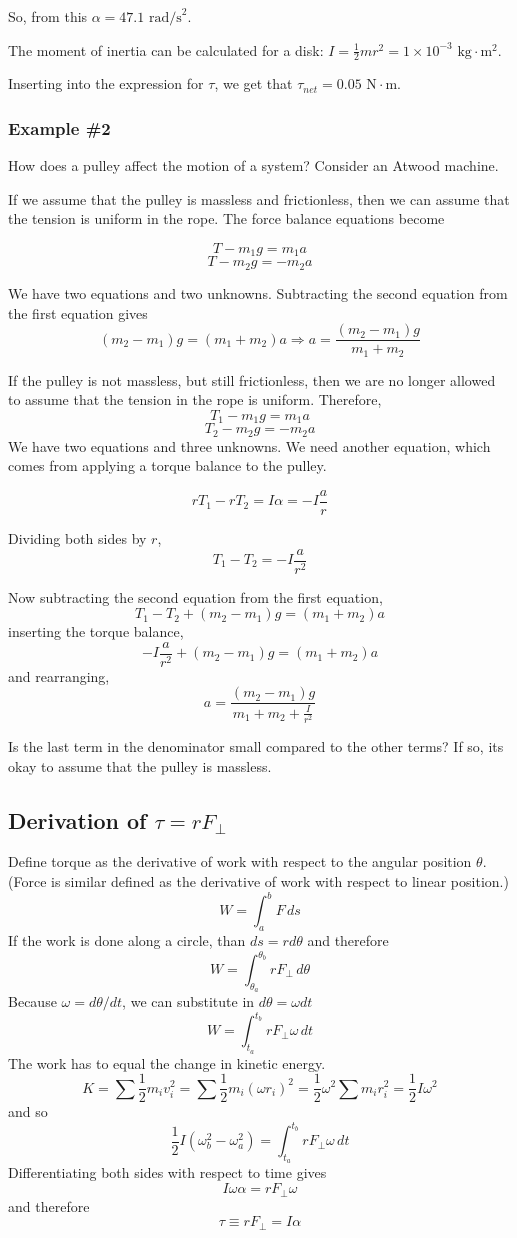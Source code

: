 So, from this $\boxed{\alpha=47.1\mbox{ rad/s}^2}$.

The moment of inertia can be calculated for a disk: $I=\frac{1}{2}mr^2=1\times 10^{-3}\mbox{ kg}\cdot\mbox{m}^2$.

Inserting into the expression for $\tau$, we get that $\boxed{\tau_{net}=0.05\mbox{ N}\cdot\mbox{m}}$.


\subsubsection{Example \#2}
How does a pulley affect the motion of a system? Consider an Atwood machine.
\vspace{5cm}

If we assume that the pulley is massless and frictionless, then we can assume that the tension is uniform in the rope. The force balance equations become

$$T-m_1g=m_1a$$
$$T-m_2g=-m_2a$$

We have two equations and two unknowns. Subtracting the second equation from the first equation gives
$$(m_2-m_1)g=(m_1+m_2)a\Rightarrow \boxed{a=\frac{(m_2-m_1)g}{m_1+m_2}}$$

If the pulley is not massless, but still frictionless, then we are no longer allowed to assume that the tension in the rope is uniform. Therefore,
$$T_1-m_1g=m_1a$$
$$T_2-m_2g=-m_2a$$
We have two equations and three unknowns. We need another equation, which comes from applying a torque balance to the pulley.

$$rT_1-rT_2=I\alpha=-I\frac{a}{r}$$

Dividing both sides by $r$,
$$T_1-T_2=-I\frac{a}{r^2}$$

Now subtracting the second equation from the first equation,
$$T_1-T_2+(m_2-m_1)g=(m_1+m_2)a$$
inserting the torque balance,
$$-I\frac{a}{r^2}+(m_2-m_1)g=(m_1+m_2)a$$
and rearranging,
$$\boxed{a=\frac{(m_2-m_1)g}{m_1+m_2+\frac{I}{r^2}}}$$

Is the last term in the denominator small compared to the other terms? If so, its okay to assume that the pulley is massless.


\subsection{Derivation of $\tau=rF_\perp$}
Define torque as the derivative of work with respect to the angular position $\theta$. (Force is similar defined as the derivative of work with respect to linear position.)
$$\displaystyle W = \int_a^b F\,ds$$
If the work is done along a circle, than $ds = rd\theta$ and therefore
$$\displaystyle W = \int_{\theta_a}^{\theta_b} rF_\perp\,d\theta$$
Because $\omega=d\theta/dt$, we can substitute in $d\theta=\omega dt$
$$\displaystyle W = \int_{t_a}^{t_b}rF_\perp\omega\,dt$$
The work has to equal the change in kinetic energy.
$$K = \sum\frac{1}{2}m_iv_i^2 = \sum\frac{1}{2}m_i\left(\omega r_i \right)^2 = \frac{1}{2}\omega^2\sum{m_ir_i^2} = \frac{1}{2}I\omega^2$$ 
and so
$$\frac{1}{2}I\left(\omega_b^2-\omega_a^2\right) =  \int_{t_a}^{t_b}rF_\perp\omega\,dt$$
Differentiating both sides with respect to time gives
$$I\omega\alpha = rF_\perp\omega$$
and therefore
$$\boxed{\tau\equiv rF_\perp = I\alpha}$$


\clearpage
